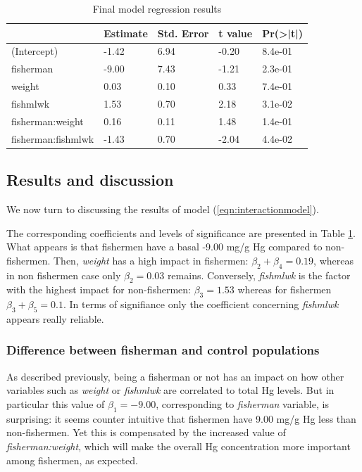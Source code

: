 \documentclass[12pt,]{article}
\begin{document}
\begin{table}[t]

\caption{\label{tab:unnamed-chunk-14}\label{tbl:interactionmodel}Final model regression results}
\centering
\begin{tabular}{l|l|l|l|l}
\hline
  & Estimate & Std. Error & t value & Pr(>|t|)\\
\hline
\rowcolor{gray!6}  (Intercept) & -1.42 & 6.94 & -0.20 & 8.4e-01\\
\hline
fisherman & -9.00 & 7.43 & -1.21 & 2.3e-01\\
\hline
\rowcolor{gray!6}  weight & 0.03 & 0.10 & 0.33 & 7.4e-01\\
\hline
fishmlwk & 1.53 & 0.70 & 2.18 & 3.1e-02\\
\hline
\rowcolor{gray!6}  fisherman:weight & 0.16 & 0.11 & 1.48 & 1.4e-01\\
\hline
fisherman:fishmlwk & -1.43 & 0.70 & -2.04 & 4.4e-02\\
\hline
\end{tabular}
\end{table}

\subsection{Results and discussion}\label{results-and-discussion}

We now turn to discussing the results of model
(\ref{eqn:interactionmodel}).

The corresponding coefficients and levels of significance are presented
in Table \ref{tbl:interactionmodel}. What appears is that fishermen have
a basal -9.00 mg/g Hg compared to non-fishermen. Then, \emph{weight} has
a high impact in fishermen: \(\beta_2+\beta_4 = 0.19\), whereas in non
fishermen case only \(\beta_2 = 0.03\) remains. Conversely,
\emph{fishmlwk} is the factor with the highest impact for non-fishermen:
\(\beta_3 = 1.53\) whereas for fishermen \(\beta_3+\beta_5 = 0.1\). In
terms of signifiance only the coefficient concerning \emph{fishmlwk}
appears really reliable.

\subsubsection{Difference between fisherman and control
populations}\label{difference-between-fisherman-and-control-populations}

As described previously, being a fisherman or not has an impact on how
other variables such as \emph{weight} or \emph{fishmlwk} are correlated
to total Hg levels. But in particular this value of \(\beta_1 = -9.00\),
corresponding to \emph{fisherman} variable, is surprising: it seems
counter intuitive that fishermen have 9.00 mg/g Hg less than
non-fishermen. Yet this is compensated by the increased value of
\emph{fisherman:weight}, which will make the overall Hg concentration
more important among fishermen, as expected.
\end{document}
